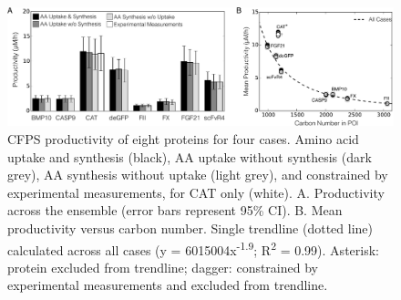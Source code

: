 \documentclass[journal=asbcd6,manuscript=article]{achemso}
\begin{document}
\begin{figure}[t!]
\centering
\includegraphics[width=1.00\textwidth]{./Figures/Productivity.pdf}
\caption{CFPS productivity of eight proteins for four cases. Amino acid uptake and synthesis (black), AA uptake without synthesis (dark grey), AA synthesis without uptake (light grey), and constrained by experimental measurements, for CAT only (white). A. Productivity across the ensemble (error bars represent 95\% CI). B. Mean productivity versus carbon number. Single trendline (dotted line) calculated across all cases (y = 6015004x\textsuperscript{-1.9}; R\textsuperscript{2} = 0.99). Asterisk: protein excluded from trendline; dagger: constrained by experimental measurements and excluded from trendline.}
\label{fig:Prod}
\end{figure}
\end{document}
